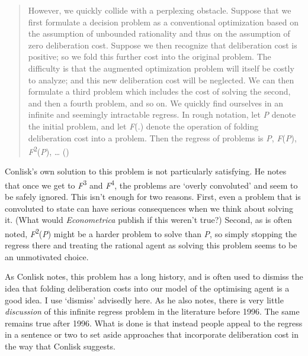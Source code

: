 \documentclass[
  10pt,
  letterpaper,
  DIV=11,
  numbers=noendperiod,
  twoside]{scrartcl}
\begin{document}
\begin{quote}
However, we quickly collide with a perplexing obstacle. Suppose that we
first formulate a decision problem as a conventional optimization based
on the assumption of unbounded rationality and thus on the assumption of
zero deliberation cost. Suppose we then recognize that deliberation cost
is positive; so we fold this further cost into the original problem. The
difficulty is that the augmented optimization problem will itself be
costly to analyze; and this new deliberation cost will be neglected. We
can then formulate a third problem which includes the cost of solving
the second, and then a fourth problem, and so on. We quickly find
ourselves in an infinite and seemingly intractable regress. In rough
notation, let \emph{P} denote the initial problem, and let \emph{F}(.)
denote the operation of folding deliberation cost into a problem. Then
the regress of problems is \emph{P}, \emph{F}(\emph{P}),
\emph{F}\textsuperscript{2}(\emph{P}), \ldots{}
()
\end{quote}

Conlisk's own solution to this problem is not particularly satisfying.
He notes that once we get to \emph{F}\textsuperscript{3} and
\emph{F}\textsuperscript{4}, the problems are `overly convoluted' and
seem to be safely ignored. This isn't enough for two reasons. First,
even a problem that is convoluted to state can have serious consequences
when we think about solving it. (What would \emph{Econometrica} publish
if this weren't true?) Second, as is often noted,
\emph{F}\textsuperscript{2}(\emph{P}) might be a harder problem to solve
than \emph{P}, so simply stopping the regress there and treating the
rational agent as solving this problem seems to be an unmotivated
choice.

As Conlisk notes, this problem has a long history, and is often used to
dismiss the idea that folding deliberation costs into our model of the
optimising agent is a good idea. I use `dismiss' advisedly here. As he
also notes, there is very little \emph{discussion} of this infinite
regress problem in the literature before 1996. The same remains true
after 1996. What is done is that instead people appeal to the regress in
a sentence or two to set aside approaches that incorporate deliberation
cost in the way that Conlisk suggests.
\end{document}
